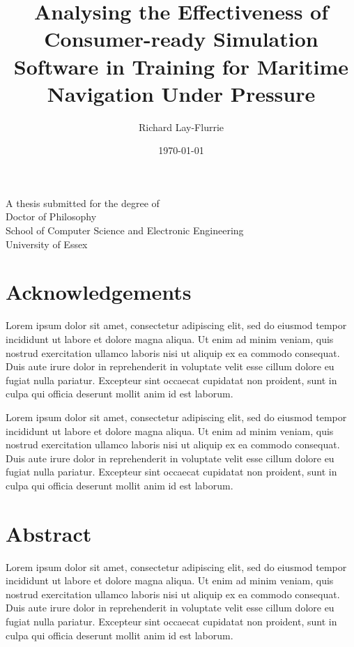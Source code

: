 \documentclass[12pt]{article}
\title{Analysing the Effectiveness of Consumer-ready Simulation Software in Training for Maritime Navigation Under Pressure}
\author{Richard Lay-Flurrie}
\date{\today}
\begin{document}
\maketitle
\thispagestyle{empty}

\begin{center}
  \vfill
  \large
  A thesis submitted for the degree of\\
  Doctor of Philosophy\\
  \vfill
  \normalsize
  School of Computer Science and Electronic Engineering\\
  University of Essex\\
  \vfill
\end{center}

\newpage

\section*{Acknowledgements}

Lorem ipsum dolor sit amet, consectetur adipiscing elit, sed do eiusmod tempor incididunt ut labore et dolore magna aliqua. Ut enim ad minim veniam, quis nostrud exercitation ullamco laboris nisi ut aliquip ex ea commodo consequat. Duis aute irure dolor in reprehenderit in voluptate velit esse cillum dolore eu fugiat nulla pariatur. Excepteur sint occaecat cupidatat non proident, sunt in culpa qui officia deserunt mollit anim id est laborum.

Lorem ipsum dolor sit amet, consectetur adipiscing elit, sed do eiusmod tempor incididunt ut labore et dolore magna aliqua. Ut enim ad minim veniam, quis nostrud exercitation ullamco laboris nisi ut aliquip ex ea commodo consequat. Duis aute irure dolor in reprehenderit in voluptate velit esse cillum dolore eu fugiat nulla pariatur. Excepteur sint occaecat cupidatat non proident, sunt in culpa qui officia deserunt mollit anim id est laborum.

\newpage

\section*{Abstract}

Lorem ipsum dolor sit amet, consectetur adipiscing elit, sed do eiusmod tempor incididunt ut labore et dolore magna aliqua. Ut enim ad minim veniam, quis nostrud exercitation ullamco laboris nisi ut aliquip ex ea commodo consequat. Duis aute irure dolor in reprehenderit in voluptate velit esse cillum dolore eu fugiat nulla pariatur. Excepteur sint occaecat cupidatat non proident, sunt in culpa qui officia deserunt mollit anim id est laborum.
\end{document}
